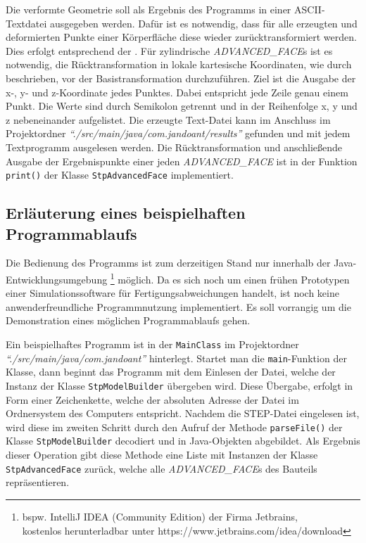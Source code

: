Die verformte Geometrie soll als Ergebnis des Programms in einer ASCII-Textdatei ausgegeben werden. Dafür ist es notwendig, dass für alle erzeugten und deformierten Punkte einer Körperfläche diese wieder zurücktransformiert werden. Dies erfolgt entsprechend der . Für zylindrische \textit{ADVANCED\_FACE}s ist es notwendig, die Rücktransformation in lokale kartesische Koordinaten, wie durch  beschrieben, vor der Basistransformation durchzuführen. 
Ziel ist die Ausgabe der x-, y- und z-Koordinate jedes Punktes. Dabei entspricht jede Zeile genau einem Punkt. Die Werte sind durch Semikolon getrennt und in der Reihenfolge x, y und z nebeneinander aufgelistet. Die erzeugte Text-Datei kann im Anschluss im Projektordner \textit{"`./src/\-main/\-java/\-com.jandoant/results"'} gefunden und mit jedem Textprogramm ausgelesen werden. Die Rücktransformation und anschließende Ausgabe der Ergebnispunkte einer jeden \textit{ADVANCED\_FACE} ist in der Funktion \verb|print()| der Klasse \verb|StpAdvancedFace| implementiert.

\subsection{Erläuterung eines beispielhaften Programmablaufs}

Die Bedienung des Programms ist zum derzeitigen Stand nur innerhalb der Java-Ent\-wick\-lungs\-um\-geb\-ung \footnote{bspw. IntelliJ IDEA (Community Edition) der Firma Jetbrains,\\ kostenlos herunterladbar unter https://www.jetbrains.com/idea/download} möglich. Da es sich noch um einen frühen Prototypen einer Simulationssoftware für Fertigungsabweichungen handelt, ist noch keine anwenderfreundliche Programmnutzung implementiert. Es soll vorrangig um die Demonstration eines möglichen Programmablaufs gehen. 

Ein beispielhaftes Programm ist in der \verb|MainClass| im Projektordner \textit{"`./src/\-main/\-java/\-com.jandoant"'} hinterlegt. Startet man die \verb|main|-Funktion der Klasse, dann beginnt das Programm mit dem Einlesen der Datei, welche der Instanz der Klasse \verb|StpModelBuilder| übergeben wird. Diese Übergabe, erfolgt in Form einer Zeichenkette, welche der absoluten Adresse der Datei im Ordnersystem des Computers entspricht.
Nachdem die STEP-Datei eingelesen ist, wird diese im zweiten Schritt durch den Aufruf der Methode \verb|parseFile()| der Klasse \verb|StpModelBuilder| decodiert und in Java-Objekten abgebildet. Als Ergebnis dieser Operation gibt diese Methode eine Liste mit Instanzen der Klasse \verb|StpAdvancedFace| zurück, welche alle \textit{ADVANCED\_FACE}s des Bauteils repräsentieren.

